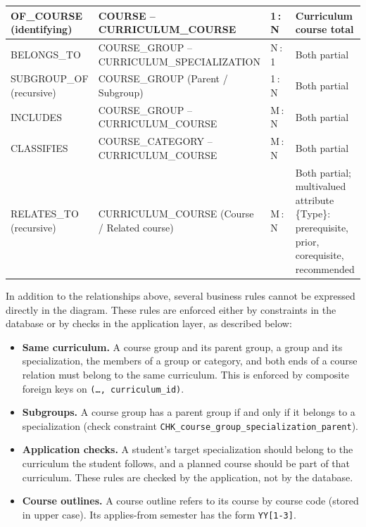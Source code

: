 \begin{longtable}{|p{}|p{}|p{}|p{}|}
\hline
OF\_\allowbreak{}COURSE (identifying) & COURSE -- CURRICULUM\_\allowbreak{}COURSE & 1\,:\,N & Curriculum course total \\
\hline
BELONGS\_\allowbreak{}TO & COURSE\_\allowbreak{}GROUP -- CURRICULUM\_\allowbreak{}SPECIALIZATION & N\,:\,1 & Both partial \\
\hline
SUBGROUP\_\allowbreak{}OF (recursive) & COURSE\_\allowbreak{}GROUP (Parent / Subgroup) & 1\,:\,N & Both partial \\
\hline
INCLUDES & COURSE\_\allowbreak{}GROUP -- CURRICULUM\_\allowbreak{}COURSE & M\,:\,N & Both partial \\
\hline
CLASSIFIES & COURSE\_\allowbreak{}CATEGORY -- CURRICULUM\_\allowbreak{}COURSE & M\,:\,N & Both partial \\
\hline
RELATES\_\allowbreak{}TO (recursive) & CURRICULUM\_\allowbreak{}COURSE (Course / Related course) & M\,:\,N & Both partial; multivalued attribute \{Type\}: prerequisite, prior, corequisite, recommended \\
\hline
\end{longtable}
\endgroup

In addition to the relationships above, several business rules cannot be expressed directly in the diagram. These rules are enforced either by constraints in the database or by checks in the application layer, as described below:
\begin{itemize}
    \item \textbf{Same curriculum.} A course group and its parent group, a group and its specialization, the members of a group or category, and both ends of a course relation must belong to the same curriculum. This is enforced by composite foreign keys on \texttt{(\ldots, curriculum\_id)}.
    \item \textbf{Subgroups.} A course group has a parent group if and only if it belongs to a specialization (check constraint \texttt{CHK\_course\_group\_specialization\_parent}).
    \item \textbf{Application checks.} A student's target specialization should belong to the curriculum the student follows, and a planned course should be part of that curriculum. These rules are checked by the application, not by the database.
    \item \textbf{Course outlines.} A course outline refers to its course by course code (stored in upper case). Its applies-from semester has the form \texttt{YY[1-3]}.
\end{itemize}

